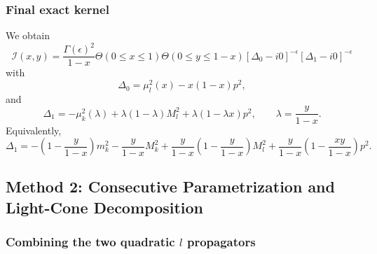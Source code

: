 \documentclass[11pt]{article}
\begin{document}
\subsubsection{Final exact kernel}
We obtain
\begin{equation}
\boxed{
\mathcal I(x,y)=
\frac{\Gamma(\epsilon)^2}{1-x}
\Theta(0\le x\le1)\Theta(0\le y\le1-x)
[\Delta_0-i0]^{-\epsilon}[\Delta_1-i0]^{-\epsilon}
}
\label{eq:closed-form-kernel}
\end{equation}
with
\begin{equation}
\Delta_0=\mu_l^2(x)-x(1-x)p^2,
\label{eq:Delta0-final}
\end{equation}
and
\begin{equation}
\Delta_1=
-\mu_k^2(\lambda)+\lambda(1-\lambda)M_l^2+\lambda(1-\lambda x)p^2,
\qquad \lambda=\frac{y}{1-x}.
\label{eq:Delta1-final}
\end{equation}
Equivalently,
\begin{equation}
\Delta_1=-
\left(1-\frac{y}{1-x}\right)m_k^2
-\frac{y}{1-x}M_k^2
+\frac{y}{1-x}\left(1-\frac{y}{1-x}\right)M_l^2
+\frac{y}{1-x}\left(1-\frac{xy}{1-x}\right)p^2.
\label{eq:Delta1-final-expanded}
\end{equation}



\newpage

\subsection{Method 2: Consecutive Parametrization and Light-Cone Decomposition}

\subsubsection{Combining the two quadratic $l$ propagators}
\end{document}
